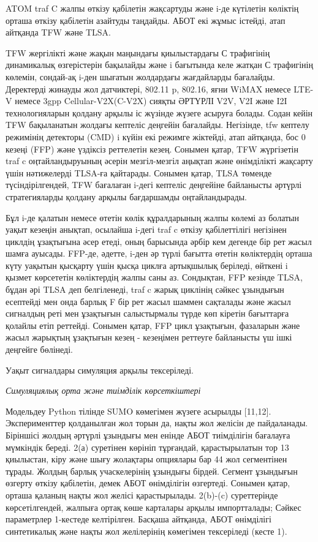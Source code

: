 \begin{multicols}{2}

ATOM traf C жалпы өткізу қабілетін жақсартуды және i-де күтілетін
көліктің орташа өткізу қабілетін азайтуды таңдайды. АБОТ екі жұмыс
істейді, атап айтқанда TFW және TLSA.

TFW жергілікті және жақын маңындағы қиылыстардағы С трафигінің
динамикалық өзгерістерін бақылайды және i бағытында келе жатқан С
трафигінің көлемін, сондай-ақ i-ден шығатын жолдардағы жағдайларды
бағалайды. Деректерді жинауды жол датчиктері, 802.11 p, 802.16, яғни
WiMAX немесе LTE-V немесе 3gpp Cellular-V2X(C-V2X) сияқты ӘРТҮРЛІ V2V,
V2I және I2I технологияларын қолдану арқылы іс жүзінде жүзеге асыруға
болады. Содан кейін TFW бақыланатын жолдағы кептеліс деңгейін бағалайды.
Негізінде, tfw кептелу режимінің детекторы (CMD) i күйін екі режимге
жіктейді, атап айтқанда, бос 0 кезеңі (FFP) және үздіксіз реттелетін
кезең. Сонымен қатар, TFW жүргізетін traf c оңтайландыруының әсерін
мезгіл-мезгіл аңықтап және өнімділікті жақсарту үшін нәтижелерді TLSA-ға
қайтарады. Сонымен қатар, TLSA төменде түсіндірілгендей, TFW бағалаған
i-дегі кептеліс деңгейіне байланысты әртүрлі стратегияларды қолдану
арқылы бағдаршамды оңтайландырады.

Бұл i-де қалатын немесе өтетін көлік құралдарының жалпы көлемі аз
болатын уақыт кезеңін анықтап, осылайша i-дегі traf c өткізу
қабілеттілігі негізінен циклдің ұзақтығына әсер етеді, оның барысында
әрбір кем дегенде бір рет жасыл шамға ауысады. FFP-де, әдетте, i-ден әр
түрлі бағытта өтетін көліктердің орташа күту уақытын қысқарту үшін қысқа
циклға артықшылық беріледі, өйткені i қызмет көрсететін көліктердің
жалпы саны аз. Сондықтан, FFP кезінде TLSA, бұдан әрі TLSA деп
белгіленеді, traf c жарық циклінің сәйкес ұзындығын есептейді мен онда
барлық F бір рет жасыл шаммен сақталады және жасыл сигналдың реті мен
ұзақтығын салыстырмалы түрде көп кіретін бағыттарға қолайлы етіп
реттейді. Сонымен қатар, FFP цикл ұзақтығын, фазаларын және жасыл
жарықтың ұзақтығын кезең - кезеңімен реттеуге байланысты үш ішкі
деңгейге бөлінеді.

Уақыт сигналдары симуляция арқылы тексеріледі.

\emph{Симуляциялық орта және тиімділік көрсеткіштері}

Модельдеу Python тілінде SUMO көмегімен жүзеге асырылды {[}11,12{]}.
Эксперименттер қолданылған жол торын да, нақты жол желісін де
пайдаланады. Біріншісі жолдың әртүрлі ұзындығы мен енінде АБОТ
тиімділігін бағалауға мүмкіндік береді. 2(а) суретінен көрініп
тұрғандай, қарастырылатын тор 13 қиылыстан, кіру және шығу жолақтары
опциялары бар 44 жол сегментінен тұрады. Жолдың барлық учаскелерінің
ұзындығы бірдей. Сегмент ұзындығын өзгерту өткізу қабілетін, демек АБОТ
өнімділігін өзгертеді. Сонымен қатар, орташа қаланың нақты жол желісі
қарастырылады. 2(b)-(c) суреттерінде көрсетілгендей, жалпыға ортақ көше
карталары арқылы импортталады; Сәйкес параметрлер 1-кестеде келтірілген.
Басқаша айтқанда, АБОТ өнімділігі синтетикалық және нақты жол
желілерінің көмегімен тексеріледі (кесте 1).
\end{multicols}


